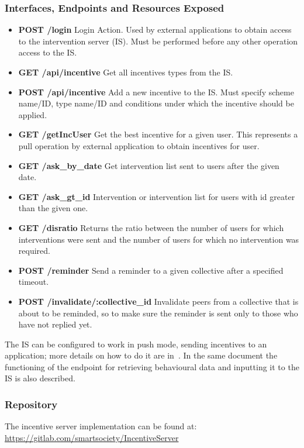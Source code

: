 \subsubsection{Interfaces, Endpoints and Resources Exposed}
\begin{itemize}
\item {\bf POST /login} Login Action. Used by external applications to obtain access to the intervention server (IS). Must be performed before any other operation access to the IS.
\item {\bf GET /api/incentive} Get all incentives types from the IS.
\item {\bf POST /api/incentive} Add a new incentive to the IS. Must specify scheme name/ID, type name/ID and conditions under which the incentive should be applied.
\item {\bf GET /getIncUser} Get the best incentive for a given user. This represents a pull operation by external application to obtain incentives for user.
\item {\bf GET /ask\_by\_date}  Get intervention list sent to users after the given date. 
\item {\bf GET /ask\_gt\_id} Intervention or intervention list for users with id greater than the given one.
\item {\bf GET /disratio} Returns the ratio between the number of users for which interventions were sent and the number of users for which no intervention was required.
\item {\bf POST /reminder} Send a reminder to a given collective after a specified timeout.
\item {\bf POST /invalidate/:collective\_id} Invalidate peers from a collective that is about to be reminded, so to make sure the reminder is sent only to those who have not replied yet.
\end{itemize}
The IS can be configured to work in push mode, sending incentives to an application; more details on how to do it are in~\cite{D5.4}. In the same document the functioning of the endpoint for retrieving behavioural data and inputting it to the IS is also described.
\subsubsection{Repository}
The incentive server implementation can be found at: \url{https://gitlab.com/smartsociety/IncentiveServer}